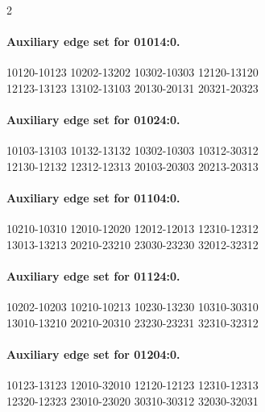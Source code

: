 \begin{multicols}{2}
\paragraph{Auxiliary edge set for 01014:0.}
\begingroup\footnotesize\ttfamily\begin{flushleft}
10120-10123 10202-13202 10302-10303 12120-13120\\
12123-13123 13102-13103 20130-20131 20321-20323\\
\end{flushleft}\endgroup
\paragraph{Auxiliary edge set for 01024:0.}
\begingroup\footnotesize\ttfamily\begin{flushleft}
10103-13103 10132-13132 10302-10303 10312-30312\\
12130-12132 12312-12313 20103-20303 20213-20313\\
\end{flushleft}\endgroup
\paragraph{Auxiliary edge set for 01104:0.}
\begingroup\footnotesize\ttfamily\begin{flushleft}
10210-10310 12010-12020 12012-12013 12310-12312\\
13013-13213 20210-23210 23030-23230 32012-32312\\
\end{flushleft}\endgroup
\paragraph{Auxiliary edge set for 01124:0.}
\begingroup\footnotesize\ttfamily\begin{flushleft}
10202-10203 10210-10213 10230-13230 10310-30310\\
13010-13210 20210-20310 23230-23231 32310-32312\\
\end{flushleft}\endgroup
\paragraph{Auxiliary edge set for 01204:0.}
\begingroup\footnotesize\ttfamily\begin{flushleft}
10123-13123 12010-32010 12120-12123 12310-12313\\
12320-12323 23010-23020 30310-30312 32030-32031\\
\end{flushleft}\endgroup

\end{multicols}
